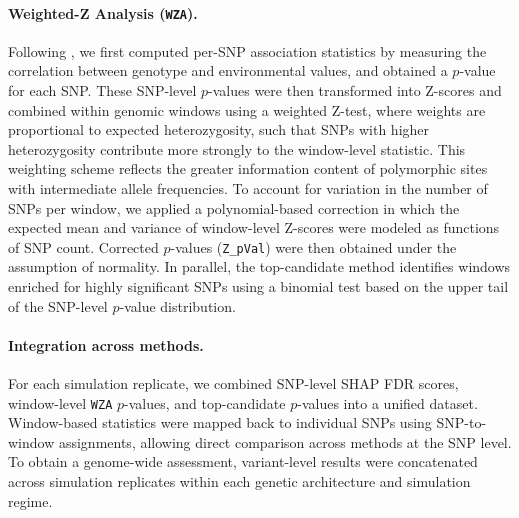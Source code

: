\documentclass[]{article}
\begin{document}
\paragraph{Weighted-Z Analysis (\texttt{WZA}).}
Following \citet{booker_wza_2024},
we first computed per-SNP association statistics
by measuring the correlation
between genotype and environmental values,
and obtained a $p$-value for each SNP.
These SNP-level $p$-values were then transformed
into Z-scores and combined within genomic windows
using a weighted Z-test,
where weights are proportional to expected heterozygosity,
such that SNPs with higher heterozygosity
contribute more strongly to the window-level statistic.
This weighting scheme reflects the greater information content
of polymorphic sites with intermediate allele frequencies.
To account for variation in the number of SNPs per window,
we applied a polynomial-based correction
in which the expected mean and variance
of window-level Z-scores were modeled
as functions of SNP count.
Corrected $p$-values (\texttt{Z\_pVal})
were then obtained under the assumption of normality.
In parallel,
the top-candidate method identifies windows
enriched for highly significant SNPs
using a binomial test based on the upper tail
of the SNP-level $p$-value distribution.

\paragraph{Integration across methods.}
For each simulation replicate,
we combined SNP-level SHAP FDR scores,
window-level \texttt{WZA} $p$-values,
and top-candidate $p$-values
into a unified dataset.
Window-based statistics were mapped back to individual SNPs
using SNP-to-window assignments,
allowing direct comparison across methods
at the SNP level.
To obtain a genome-wide assessment,
variant-level results were concatenated
across simulation replicates
within each genetic architecture
and simulation regime.
\end{document}

